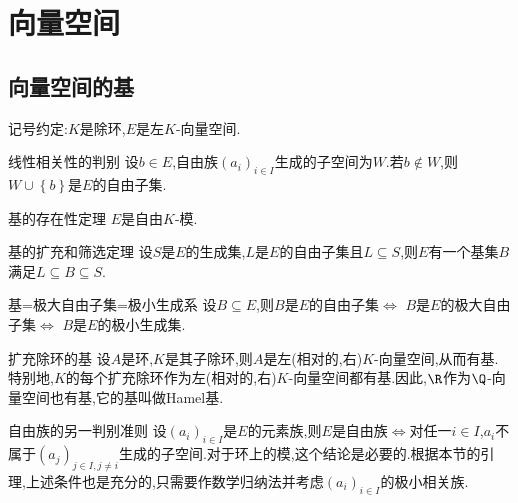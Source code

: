 \chapter{向量空间}

\section{向量空间的基}

记号约定:$K$是除环,$E$是左$K$-向量空间.

\begin{lemma}{线性相关性的判别}{}
	设$b\in E$,自由族$\left(a_{i}\right)_{i\in I}$生成的子空间为$W$.若$b\notin W$,则$W\cup\left\{b\right\}$是$E$的自由子集.
\end{lemma}

\begin{theorem}{基的存在性定理}{}
	$E$是自由$K$-模.
\end{theorem}

\begin{theorem}{基的扩充和筛选定理}{}
	设$S$是$E$的生成集,$L$是$E$的自由子集且$L\subseteq S$,则$E$有一个基集$B$满足$L\subseteq B\subseteq S$.
\end{theorem}

\begin{corollary}{基=极大自由子集=极小生成系}{}
	设$B\subseteq E$,则$B$是$E$的自由子集$\iff$ $B$是$E$的极大自由子集$\iff$ $B$是$E$的极小生成集.
\end{corollary}

\begin{example}{扩充除环的基}{}
	设$A$是环,$K$是其子除环,则$A$是左(相对的,右)$K$-向量空间,从而有基.特别地,$K$的每个扩充除环作为左(相对的,右)$K$-向量空间都有基.因此,$\R$作为$\Q$-向量空间也有基,它的基叫做Hamel基.
\end{example}

\begin{remark}{自由族的另一判别准则}{}
	设$\left(a_{i}\right)_{i\in I}$是$E$的元素族,则$E$是自由族$\iff$对任一$i\in I$,$a_{i}$不属于$\left(a_{j}\right)_{j\in I,j\neq i}$生成的子空间.对于环上的模,这个结论是必要的.根据本节的引理,上述条件也是充分的,只需要作数学归纳法并考虑$\left(a_{i}\right)_{i\in I}$的极小相关族.
\end{remark}










